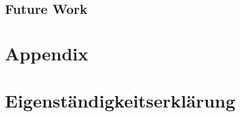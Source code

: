 \documentclass[12pt,a4paper, english]{article}
\begin{document}
\subsection{Future Work}

\newpage
\section{Appendix}
%
%
\newpage
\printbibliography%
\newpage
\section*{Eigenständigkeitserklärung}

\end{document}
